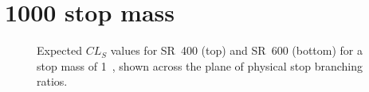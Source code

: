 \FloatBarrier

\newpage
\section{1000 \texorpdfstring{\GeV}{GeV} stop mass}

\begin{figure}[ht]
  \centering
  \caption{
    Expected
    $CL_S$ values for SR~400 (top) and SR~600 (bottom) for a stop mass of
    1~\TeV,
    shown across the plane of physical stop branching ratios.
  }
\end{figure}

